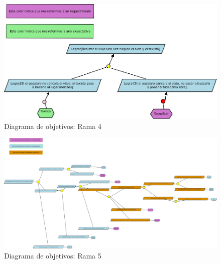 \begin{figure}[h!]
  \centering        
    \includegraphics[scale=0.50]{diagramas/objetivos/objetivosrama4.png}
  \caption{Diagrama de objetivos: Rama 4}
\end{figure}

\begin{landscape}
\begin{figure}[h!]
  \centering        
    \includegraphics[scale=0.215]{diagramas/objetivos/objetivosrama5.png}
  \caption{Diagrama de objetivos: Rama 5}
\end{figure}
\end{landscape}

